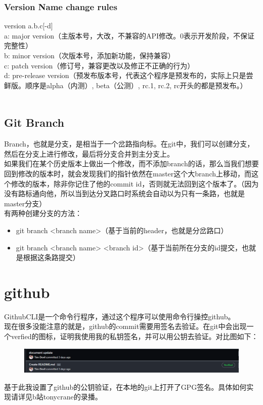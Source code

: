 \documentclass{article}
\begin{document}
\subsubsection{Version Name change rules}
version a.b.c[-d]\\
a: major version（主版本号，大改，不兼容的API修改。0表示开发阶段，不保证完整性）\\
b: minor version（次版本号，添加新功能，保持兼容）\\
c: patch version（修订号，兼容更改以及修正不正确的行为）\\
d: pre-release version（预发布版本号，代表这个程序是预发布的，实际上只是尝鲜版。顺序是alpha（内测）, beta（公测）, rc.1, rc.2, rc开头的都是预发布。）\\
\\
\subsection{Git Branch}
Branch，也就是分支，是相当于一个岔路指向标。在git中，我们可以创建分支，然后在分支上进行修改，最后将分支合并到主分支上。\\
如果我们在某个历史版本上做出一个修改，而不添加branch的话，那么当我们想要回到修改的版本时，就会发现我们的指针依然在master这个大branch上移动，而这个修改的版本，除非你记住了他的commit id，否则就无法回到这个版本了。（因为没有路标通向他，所以当到达分叉路口时系统会自动以为只有一条路，也就是master分支）\\
有两种创建分支的方法：\\
\begin{itemize}
    \item git branch <branch name>（基于当前的header，也就是分岔路口）
    \item git branch <branch name> <branch id>（基于当前所在分支的id提交，也就是根据这条路提交）
\end{itemize}
\section{github}
\noindent
GithubCLI是一个命令行程序，通过这个程序可以使用命令行操控github。\\
现在很多没能注意的就是，github的commit需要用签名去验证。在git中会出现一个verfied的图标，证明我使用我的私钥签名，并可以用公钥去验证。对比图如下：\\
\begin{figure}[h]
    \centering
    \includegraphics[width=\textwidth]{pic1_verfied.png}\\
\end{figure}
基于此我设置了github的公钥验证，在本地的git上打开了GPG签名。具体如何实现请详见b站tonycrane的录播。\\
\end{document}

